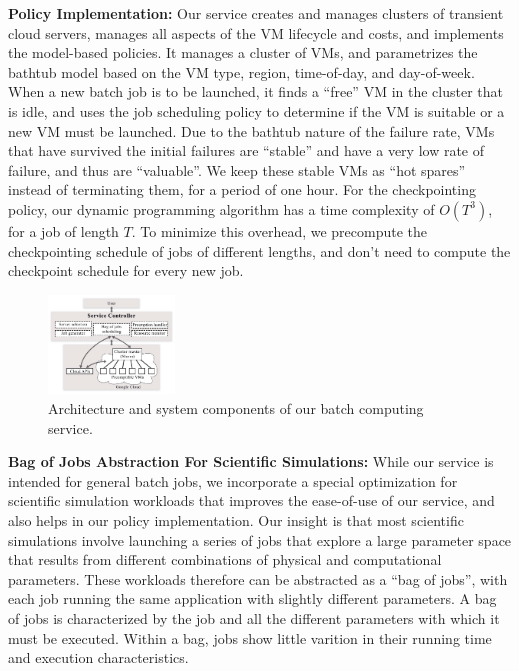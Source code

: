 \noindent \textbf{Policy Implementation:}
Our service creates and manages clusters of transient cloud servers, manages all aspects of the VM lifecycle and costs, and implements the model-based policies.
It manages a cluster of VMs, and parametrizes the bathtub model based on the VM type, region,  time-of-day, and day-of-week.
When a new batch job is to be launched, it finds a ``free'' VM in the cluster that is idle, and uses the job scheduling policy to determine if the VM is suitable or a new VM must be launched.
Due to the bathtub nature of the failure rate, VMs that have survived the initial failures are ``stable'' and have a very low rate of failure, and thus are ``valuable''.
We keep these stable VMs as ``hot spares'' instead of terminating them, for a period of one hour. 
For the checkpointing policy, our dynamic programming algorithm has a time complexity of $O(T^3)$, for a job of length $T$.
To minimize this overhead, we precompute the checkpointing schedule of jobs of different lengths, and don't need to compute the checkpoint schedule for every new job.



\begin{figure}[t]
  \includegraphics[width=0.3\textwidth]{../figures/ArchitectureRevisedV2.pdf}
\vspace*{\myfigspace}
  \caption{Architecture and system components of our batch computing service.}
  \label{fig:arch}
  \vspace*{\myfigspace}
\end{figure}


\noindent \textbf{Bag of Jobs Abstraction For Scientific Simulations:}
While our service is intended for general batch jobs, we incorporate a special optimization for scientific simulation workloads that improves the ease-of-use of our service, and also helps in our policy implementation. 
Our insight is that most scientific simulations involve launching a series of jobs that explore a large parameter space that results from different combinations of physical and computational parameters.
%
These workloads therefore can be abstracted as a ``bag of jobs'', with each job running the same application with slightly different parameters.
A bag of jobs is characterized by the job and all the different parameters with which it must be executed.
Within a bag, jobs show little varition in their running time and execution characteristics.


